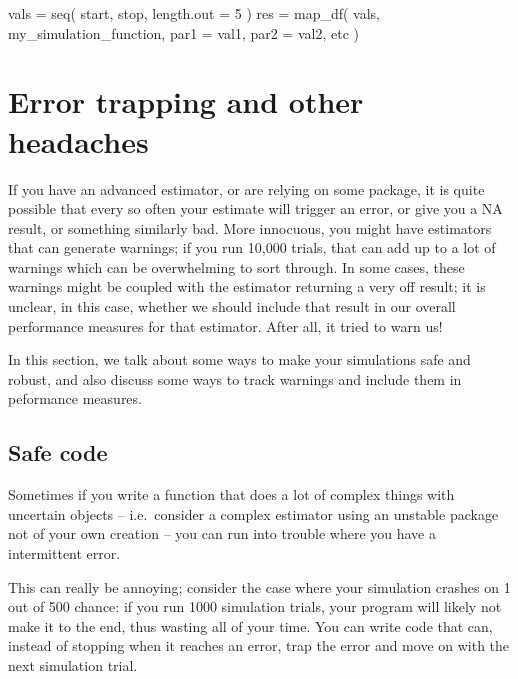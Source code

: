 \documentclass[
]{book}
\newenvironment{Shaded}{\begin{snugshade}}{\end{snugshade}}
\newcommand{\AttributeTok}[1]{\textcolor[rgb]{0.77,0.63,0.00}{#1}}
\newcommand{\DecValTok}[1]{\textcolor[rgb]{0.00,0.00,0.81}{#1}}
\newcommand{\FunctionTok}[1]{\textcolor[rgb]{0.00,0.00,0.00}{#1}}
\newcommand{\NormalTok}[1]{#1}
\newcommand{\OtherTok}[1]{\textcolor[rgb]{0.56,0.35,0.01}{#1}}
\begin{document}
\begin{Shaded}
\begin{Highlighting}[]
\NormalTok{vals }\OtherTok{=} \FunctionTok{seq}\NormalTok{( start, stop, }\AttributeTok{length.out =} \DecValTok{5}\NormalTok{ )}
\NormalTok{res }\OtherTok{=} \FunctionTok{map\_df}\NormalTok{( vals, my\_simulation\_function, }
              \AttributeTok{par1 =}\NormalTok{ val1, }\AttributeTok{par2 =}\NormalTok{ val2, etc )}
\end{Highlighting}
\end{Shaded}

\hypertarget{error-trapping-and-other-headaches}{%
\chapter{Error trapping and other headaches}\label{error-trapping-and-other-headaches}}

If you have an advanced estimator, or are relying on some package, it is quite possible that every so often your estimate will trigger an error, or give you a NA result, or something similarly bad.
More innocuous, you might have estimators that can generate warnings; if you run 10,000 trials, that can add up to a lot of warnings which can be overwhelming to sort through.
In some cases, these warnings might be coupled with the estimator returning a very off result; it is unclear, in this case, whether we should include that result in our overall performance measures for that estimator.
After all, it tried to warn us!

In this section, we talk about some ways to make your simulations safe and robust, and also discuss some ways to track warnings and include them in peformance measures.

\hypertarget{safe_code}{%
\section{Safe code}\label{safe_code}}

Sometimes if you write a function that does a lot of complex things with
uncertain objects -- i.e.~consider a complex estimator using an unstable package not of your own creation -- you can run into trouble where you have a intermittent error.

This can really be annoying; consider the case where your simulation crashes on 1 out of 500 chance: if you run 1000 simulation trials, your program will likely not make it to the end, thus wasting all of your time.
You can write code that can, instead of stopping when it reaches an error, trap the error and move on with the next simulation trial.
\end{document}
